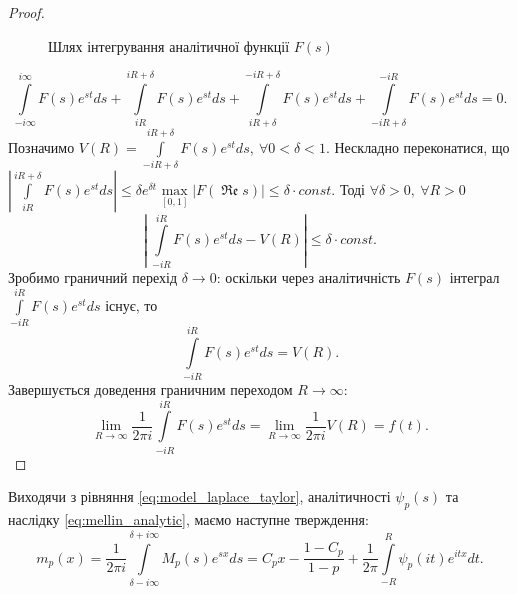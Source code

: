 \begin{corollary}
\begin{proof}
\begin{figure}[h]
	\caption{Шлях інтегрування аналітичної функції $F(s)$}
\end{figure}
\begin{equation*}
\int\limits_{-i\infty}^{i\infty} F(s) e^{st} ds + \int\limits_{iR}^{iR + \delta} F(s) e^{st} ds + \int\limits_{iR + \delta}^{-iR + \delta} F(s) e^{st} ds + \int\limits_{-iR + \delta}^{-iR} F(s) e^{st} ds = 0.
\end{equation*}
Позначимо $V(R)=\int\limits_{-iR + \delta}^{iR + \delta} F(s) e^{st} ds, ~\forall 0 < \delta < 1$. Нескладно переконатися, що 
$|\int\limits_{iR}^{iR + \delta} F(s) e^{st} ds| \leq \delta e^{\delta t} \max\limits_{[0,1]} |F(\operatorname{\mathfrak{Re}} s)| \leq \delta \cdot const$. Тоді $\forall \delta > 0, ~\forall R > 0$
\begin{equation*}
\left|~\int\limits_{-iR}^{iR} F(s) e^{st} ds - V(R)\right| \leq \delta \cdot const.
\end{equation*}
Зробимо граничний перехід $\delta \rightarrow 0$: оскільки через аналітичність $F(s)$ інтеграл $\int\limits_{-iR}^{iR} F(s) e^{st} ds$ існує, то
\begin{equation*}
\int\limits_{-iR}^{iR} F(s) e^{st} ds = V(R).
\end{equation*}
Завершується доведення граничним переходом $R \rightarrow \infty$:
\begin{equation*}
\lim\limits_{R \rightarrow \infty} \frac{1}{2\pi i} \int\limits_{-iR}^{iR} F(s) e^{st} ds =\lim\limits_{R \rightarrow \infty}\frac{1}{2\pi i} V(R) = f(t).
\end{equation*}
\end{proof}
\end{corollary}

Виходячи з рівняння \eqref{eq:model_laplace_taylor}, аналітичності $\psi_{p} (s)$ та наслідку \eqref{eq:mellin_analytic}, маємо наступне тверждення:
\begin{equation}
m_{p}(x) = \frac{1}{2\pi i} \int\limits_{\delta - i\infty}^{\delta + i\infty} M_{p}(s) e^{sx} ds = C_{p} x - \frac{1 - C_p}{1-p} + \frac{1}{2\pi} \int\limits_{-R}^{R} \psi_{p}(it) e^{itx} dt.
\end{equation}

